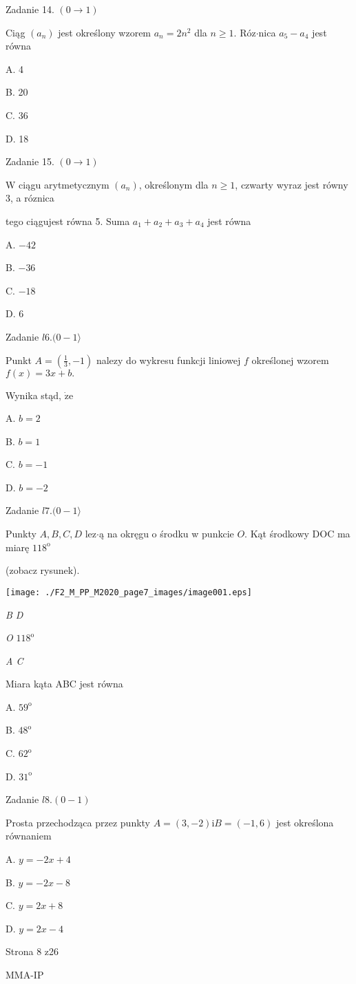 \documentclass[a4paper,12pt]{article}
\begin{document}
Zadanie 14. $(0\rightarrow 1)$

Ciąg $(a_{n})$ jest określony wzorem $a_{n}=2n^{2}$ dla $n\geq 1$. Róz$\cdot$nica $a_{5}-a_{4}$ jest równa

A. 4

B. 20

C. 36

D. 18

Zadanie 15. $(0\rightarrow 1)$

$\mathrm{W}$ ciągu arytmetycznym $(a_{n})$, określonym dla $n\geq 1$, czwarty wyraz jest równy 3, a róznica

tego ciągujest równa 5. Suma $a_{1}+a_{2}+a_{3}+a_{4}$ jest równa

A. $-42$

B. $-36$

C. $-18$

D. 6

Zadanie $l6. (0-1\rangle$

Punkt $A=(\displaystyle \frac{1}{3},-1)$ nalezy do wykresu funkcji liniowej $f$ określonej wzorem $f(x)=3x+b.$

Wynika stąd, $\dot{\mathrm{z}}\mathrm{e}$

A. $b=2$

B. $b=1$

C. $b=-1$

D. $b=-2$

Zadanie $l7. (0-1\rangle$

Punkty $A, B, C, D$ lez$\cdot$ą na okręgu o środku w punkcie $O$. Kąt środkowy DOC ma miarę $118^{\mathrm{o}}$

(zobacz rysunek).
\begin{center}
\texttt{[image: ./F2\_M\_PP\_M2020\_page7\_images/image001.eps]}
\end{center}
{\it B D}

{\it O}  $118^{\mathrm{o}}$

{\it A C}

Miara kąta ABC jest równa

A. $59^{\mathrm{o}}$

B. $48^{\mathrm{o}}$

C. $62^{\mathrm{o}}$

D. $31^{\mathrm{o}}$

Zadanie $l8. (0-1)$

Prosta przechodząca przez punkty $A=(3,-2)\mathrm{i}B=(-1,6)$ jest określona równaniem

A. $y=-2x+4$

B. $y=-2x-8$

C. $y=2x+8$

D. $y=2x-4$

Strona 8 z26

MMA-IP
\end{document}
